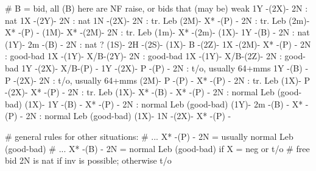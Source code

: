 # B = bid, all (B) here are NF raise, or bids that (may be) weak
 1Y -(2X)- 2N : nat
 1X -(2Y)- 2N : nat
 1N -(2X)- 2N : tr. Leb
(2M)- X* -(P) - 2N : tr. Leb
(2m)- X* -(P) - 
(1M)- X* -(2M)- 2N : tr. Leb
(1m)- X* -(2m)- 
(1X)- 1Y -(B) - 2N : nat
(1Y)- 2m -(B) - 2N : nat ?
(1S)- 2H -(2S)- 
(1X)- B  -(2Z)- 
 1X -(2M)- X* -(P) - 2N : good-bad
 1X -(1Y)- X/B-(2Y)- 2N : good-bad
 1X -(1Y)- X/B-(2Z)- 2N : good-bad 
 1Y -(2X)- X/B-(P) - 
 1Y -(2X)- P  -(P) - 2N : t/o, usually 64+mms
 1Y -(B) - P  -(2X)- 2N : t/o, usually 64+mms
(2M)- P  -(P) - X* -(P) - 2N : tr. Leb
(1X)- P  -(2X)- X* -(P) - 2N : tr. Leb
(1X)- X* -(B) - X* -(P) - 2N : normal Leb (good-bad)
(1X)- 1Y -(B) - X* -(P) - 2N : normal Leb (good-bad)
(1Y)- 2m -(B) - X* -(P) - 2N : normal Leb (good-bad)
(1X)- 1N -(2X)- X* -(P) - 

# general rules for other situations: 
# ... X* -(P) - 2N = usually normal Leb (good-bad)
# ... X* -(B) - 2N = normal Leb (good-bad) if X = neg or t/o
# free bid 2N is nat if inv is possible; otherwise t/o